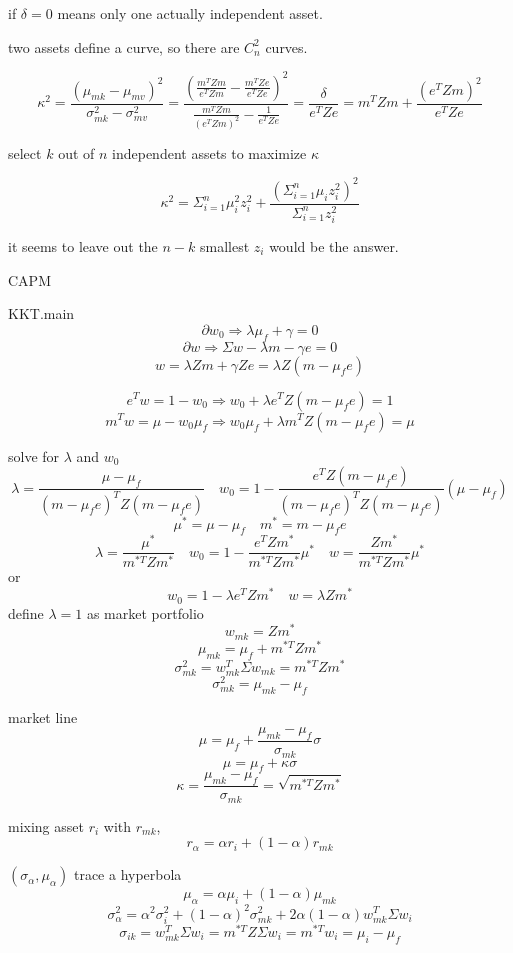 \documentclass[10pt,a4paper]{article}
\begin{document}
if $\delta = 0$ means only one actually independent asset.

two assets define a curve, so there are $C^2_n$ curves.

\[
\kappa^2 = \frac{(\mu_{mk} - \mu_{mv})^2}{\sigma^2_{mk} -\sigma^2_{mv}}=
\frac{ (\frac{m^TZm}{e^TZm}-\frac{m^TZe}{e^TZe})^2}{\frac{m^TZm}{(e^TZm)^2}-\frac{1}{e^TZe}}=\frac{\delta}{e^TZe}=m^TZm + \frac{(e^TZm)^2}{e^TZe}
\]

select $k$ out of $n$ independent assets to maximize $\kappa$

\[
\kappa^2 = \Sigma_{i=1}^{n}\mu_i^2z_i^2 + \frac{(\Sigma_{i=1}^{n}\mu_iz_i^2)^2}{\Sigma_{i=1}^{n}z_i^2}
\]

it seems to leave out the $n-k$ smallest $z_i$ would be the answer.



\newpage
CAPM

KKT.main
\[
\partial w_0 \Rightarrow \lambda \mu_f + \gamma = 0
\]
\[
\partial w \Rightarrow \Sigma w -\lambda m - \gamma e = 0
\]
\[
w = \lambda Zm + \gamma Ze = \lambda Z(m -\mu_f e)
\]

\[
e^Tw = 1 - w_0 \Rightarrow w_0 + \lambda e^TZ(m -\mu_f e) = 1
\]
\[
m^Tw = \mu - w_0\mu_f \Rightarrow w_0\mu_f + \lambda m^TZ(m -\mu_f e) = \mu
\]

solve for $\lambda$ and $w_0$
\[
\lambda = \frac{\mu - \mu_f}{(m -\mu_f e)^TZ(m -\mu_f e)} \quad w_0 = 1 - \frac{e^TZ(m -\mu_f e)}{(m -\mu_f e)^TZ(m -\mu_f e)}(\mu - \mu_f)
\]
\[
\mu^* = \mu - \mu_f \quad m^* = m - \mu_fe
\]
\[
\lambda = \frac{\mu^*}{m^{*T} Z m^*} \quad w_0 = 1- \frac{e^TZm^*}{m^{*T} Z m^*}\mu^* \quad w =  \frac{Zm^*}{m^{*T} Z m^*}\mu^*
\]
or
\[
w_0 = 1- \lambda e^TZm^* \quad w =  \lambda Zm^*
\]
define $\lambda = 1$ as market portfolio
\[
w_{mk}= Z m^*
\]
\[
\mu_{mk} = \mu_f + m^{*T} Z m^*
\]
\[
\sigma^2_{mk} = w_{mk}^T\Sigma w_{mk} = m^{*T}Zm^*
\]
\[
\sigma^2_{mk} = \mu_{mk} - \mu_f
\]

market line
\[
\mu = \mu_f + \frac{\mu_{mk}-\mu_f}{\sigma_{mk}}\sigma
\]
\[
\mu= \mu_f + \kappa\sigma
\]
\[ 
\kappa = \frac{\mu_{mk}-\mu_f}{\sigma_{mk}} = \sqrt{m^{*T}Zm^*}
\]

mixing asset $r_i$ with $r_{mk}$, 
\[
r_\alpha = \alpha r_i + (1-\alpha) r_{mk}
\]

$(\sigma_\alpha,\mu_\alpha)$ trace a hyperbola
\[
\mu_\alpha = \alpha \mu_i + (1- \alpha) \mu_{mk}
\]
\[
\sigma^2_{\alpha} = \alpha^2 \sigma^2_{i} + (1-\alpha)^2 \sigma^2_{mk} + 2\alpha(1-\alpha)w_{mk}^T \Sigma w_{i}
\]
\[
\sigma_{ik} = w_{mk}^T \Sigma w_{i} = m^{*T}Z\Sigma w_{i} = m^{*T}w_i = \mu_i - \mu_f
\]
\end{document}
